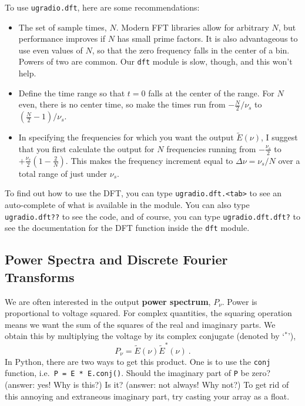 \documentclass[12pt,preprint]{aastex}
\begin{document}
To use \verb$ugradio.dft$, here are some recommendations:
\begin{itemize}

\item The set of sample times, $N$. Modern FFT libraries allow for arbitrary $N$, but performance improves
if $N$ has small prime factors. 
It is also advantageous to use even values of $N$, so that the zero frequency falls in the center of a bin.
Powers of two are common. 
Our \verb$dft$ module is slow, though, and this won't help. 

\item Define the time range so that $t=0$ falls at the center of the range.
  For $N$ even, there is no center time, so make the times
  run from $-\frac{N}{2}/ \nu_s$ to $(\frac{N}{2} -1)/ \nu_s$.

\item 
  In specifying the frequencies for which you want the output $\tilde E(\nu)$, I 
  suggest that you first calculate the output for $N$
  frequencies running from $-\frac{\nu_s}{2}$ to $+\frac{\nu_s}{2}\left(1 - \frac{2}{N} \right)$. 
This makes the frequency
  increment equal to $\Delta \nu = \nu_s/N$ over a total range of
  just under $\nu_s$.

\end{itemize}

To find out how to use the DFT, you can type {\tt ugradio.dft.<tab>} to see an
auto-complete of what is available in the module.  You can also type {\tt ugradio.dft??} to see
the code, and of course, you can type {\tt ugradio.dft.dft?} to see the documentation for
the DFT function inside the {\tt dft} module.


\subsection{Power Spectra and Discrete Fourier Transforms} 
\label{pwrspect}

We are often interested in the output {\bf power spectrum}, 
$P_\nu$.  Power is proportional to voltage squared.  For complex quantities, the squaring
operation means we want the sum of the squares of the real and imaginary
parts.  We obtain this by multiplying the voltage by its complex
conjugate (denoted by `$^*$'),
%
\begin{equation}
P_\nu = \tilde E(\nu) \tilde E^*(\nu) \ .
\end{equation}
% 
\noindent In Python, there are two ways to get this product.  One is to use
the \verb$conj$ function, i.e.\ {\tt P = E * E.conj()}.  Should the
imaginary part of \verb$P$ be zero? (answer: yes! Why is this?) Is it?
(answer: not always! Why not?) To get rid of this annoying and extraneous
imaginary part, try casting your array as a float.
 
\end{document}
